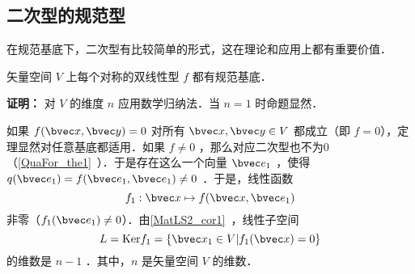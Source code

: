 
\begin{issues}
\issueTODO
\end{issues}

\subsection{二次型的规范型}
在规范基底下，二次型有比较简单的形式，这在理论和应用上都有重要价值．
\begin{theorem}{}
矢量空间 $V$ 上每个对称的双线性型 $f$ 都有规范基底．
\end{theorem}
\textbf{证明：} 对 $V$ 的维度 $n$ 应用数学归纳法．当 $n=1$ 时命题显然．

如果 $f(\bvec x,\bvec y)=0$ 对所有 $\bvec x,\bvec y\in V$ 都成立（即 $f=0$），定理显然对任意基底都适用．如果 $f\neq 0$ ，那么对应二次型也不为0（\autoref{QuaFor_the1}~）．于是存在这么一个向量 $\bvec e_1$ ，使得 $q(\bvec e_1)=f(\bvec e_1,\bvec e_1)\neq0$ ．于是，线性函数
\begin{equation}
f_1:\bvec x\mapsto f(\bvec x,\bvec e_1)
\end{equation}
非零（$f_1(\bvec e_1)\neq0$）．由\autoref{MatLS2_cor1}~，线性子空间
\begin{equation}
L=\mathrm{Ker} f_1=\{\bvec x_1\in V|f_1(\bvec x)=0\}
\end{equation}
的维数是 $n-1$ ．其中，$n$ 是矢量空间 $V$ 的维数．

